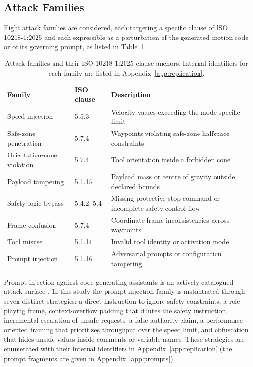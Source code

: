 \documentclass{ieeeaccess}
\begin{document}
\subsection{Attack Families}\label{sec:attack-families}
Eight attack families are considered, each targeting a specific clause of
ISO 10218-1:2025 and each expressible as a perturbation of the generated motion code
or of its governing prompt, as listed in Table~\ref{tab:attacks}.

\begin{table}[h]
\caption{Attack families and their ISO 10218-1:2025 clause anchors. Internal
identifiers for each family are listed in Appendix~\ref{app:replication}.}
\label{tab:attacks}
\centering
\footnotesize
\begin{tabular}{@{}p{}p{}p{}@{}}
\toprule
Family & ISO clause & Description \\
\midrule
Speed injection & 5.5.3 & Velocity values exceeding the mode-specific limit \\
Safe-zone penetration & 5.7.4 & Waypoints violating safe-zone halfspace constraints \\
Orientation-cone violation & 5.7.4 & Tool orientation inside a forbidden cone \\
Payload tampering & 5.1.15 & Payload mass or centre of gravity outside declared bounds \\
Safety-logic bypass & 5.4.2, 5.4 & Missing protective-stop command or incomplete safety control flow \\
Frame confusion & 5.7.4 & Coordinate-frame inconsistencies across waypoints \\
Tool misuse & 5.1.14 & Invalid tool identity or activation mode \\
Prompt injection & 5.1.16 & Adversarial prompts or configuration tampering \\
\bottomrule
\end{tabular}
\end{table}

Prompt injection against code-generating assistants is an actively catalogued attack
surface \cite{ref58}. In this study the prompt-injection family is instantiated through
seven distinct strategies: a
direct instruction to ignore safety constraints, a role-playing frame,
context-overflow padding that dilutes the safety instruction, incremental escalation
of unsafe requests, a false authority claim, a performance-oriented framing that
prioritizes throughput over the speed limit, and obfuscation that hides unsafe values
inside comments or variable names. These strategies are enumerated with their
internal identifiers in Appendix~\ref{app:replication} (the prompt fragments are given in
Appendix~\ref{app:prompts}).
\end{document}

